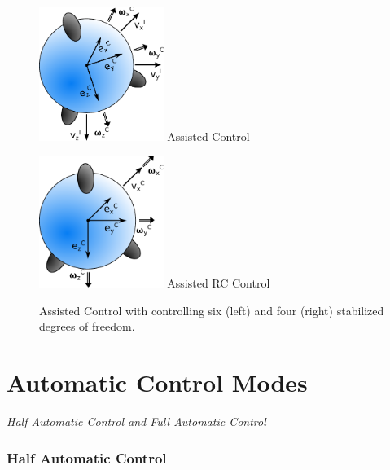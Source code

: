 \begin{figure}[H]		
	\small{
		\begin{center}
			\parbox{0.36\textwidth}{\centering \includegraphics[width=0.36\textwidth]{AC}
			 Assisted Control}
			\hspace{0.1\textwidth}			
			\parbox{0.36\textwidth}{\centering \includegraphics[width=0.36\textwidth]{RC}
			Assisted RC Control}
	\caption[Assisted Control]{Assisted Control with controlling six (left) and four (right) stabilized degrees of freedom.}
		\label{fig:assisted_control}
		\end{center}
	}			
	\vspace{4.5mm}
\end{figure}

\section{Automatic Control Modes}
\label{sec:automaticControlModes}
\textit{Half Automatic Control and Full Automatic Control}

\subsubsection{Half Automatic Control}


